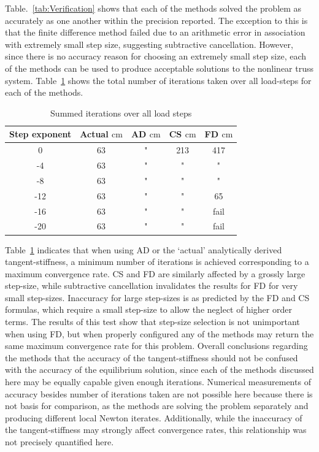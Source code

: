 \documentclass[preprint,12pt]{elsarticle}
\begin{document}
%
Table.~\ref{tab:Verification} shows that each of the methods solved the problem as accurately as one another within the precision reported. The exception to this is that the finite difference method failed due to an arithmetic error in association with extremely small step size, suggesting subtractive cancellation. However, since there is no accuracy reason for choosing an extremely small step size, each of the methods can be used to produce acceptable solutions to the nonlinear truss system. Table~\ref{tab:ConvergenceStudy} shows the total number of iterations taken over all load-steps for each of the methods. 
%
\begin{table}[tbp]    
  \centering
        \caption{Summed iterations over all load steps} \label{tab:ConvergenceStudy}   
        \begin{tabular}{c c c c c}
         \toprule
         Step exponent & Actual $\si{\centi\meter}$ & AD $\si{\centi\meter}$ & CS $\si{\centi\meter}$ & FD $\si{\centi\meter}$\\ 
        \midrule
        0 & 63 & " & 213 & 417\\
        -4 & 63 & " & " & "\\
        -8 & 63& " & " & "\\
        -12 &63& " & " &  65\\
        -16 &63& " & " & fail\\
        -20 &63& " & " & fail\\
        \bottomrule
    \end{tabular}
\end{table}
%
Table~\ref{tab:ConvergenceStudy} indicates that when using AD or the `actual' analytically derived tangent-stiffness, a minimum number of iterations is achieved corresponding to a maximum convergence rate. CS and FD are similarly affected by a grossly large step-size, while subtractive cancellation invalidates the results for FD for very small step-sizes. Inaccuracy for large step-sizes is as predicted by the FD and CS formulas, which require a small step-size to allow the neglect of higher order terms. The results of this test show that step-size selection is not unimportant when using FD, but when properly configured any of the methods may return the same maximum convergence rate for this problem.  Overall conclusions regarding the methods that the accuracy of the tangent-stiffness should not be confused with the accuracy of the equilibrium solution, since each of the methods discussed here may be equally capable given enough iterations. Numerical measurements of accuracy besides number of iterations taken are not possible here because there is not basis for comparison, as the methods are solving the problem separately and producing different local Newton iterates. Additionally, while the inaccuracy of the tangent-stiffness may strongly affect convergence rates, this relationship was not precisely quantified here.
\end{document}
